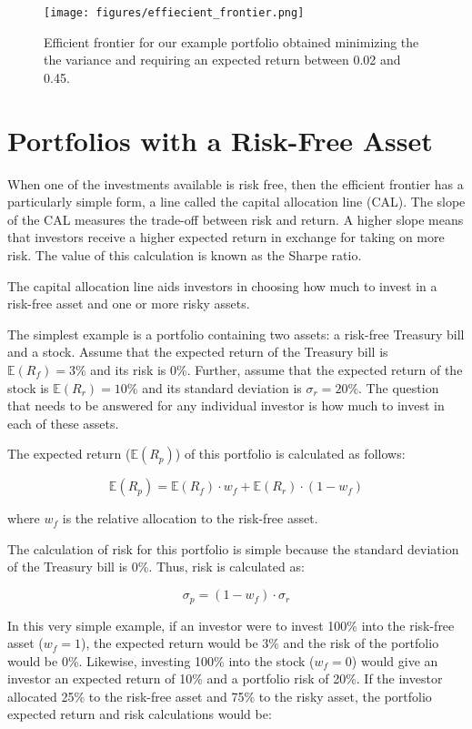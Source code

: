 \begin{figure}[htb]
\centering
\texttt{[image: figures/effiecient\_frontier.png]}
\caption{Efficient frontier for our example portfolio obtained minimizing the the variance and requiring an expected return between 0.02 and 0.45.}
\label{fig:efficient_frontier}
\end{figure}
    
\section{Portfolios with a Risk-Free
Asset}\label{portfolios-with-a-risk-free-asset}

When one of the investments available is risk free, then the efficient
frontier has a particularly simple form, a line called the capital
allocation line (CAL). The slope of the CAL measures the trade-off
between risk and return. A higher slope means that investors receive a
higher expected return in exchange for taking on more risk. The value of
this calculation is known as the Sharpe ratio.

The capital allocation line aids investors in choosing how much to
invest in a risk-free asset and one or more risky assets.

The simplest example is a portfolio containing two assets: a risk-free
Treasury bill and a stock. Assume that the expected return of the
Treasury bill is \(\mathbb{E}(R_f)=3\%\) and its risk is 0\%. Further, assume that
the expected return of the stock is \(\mathbb{E}(R_r)=10\%\) and its standard
deviation is \(\sigma_r=20\%\). The question that needs to be answered
for any individual investor is how much to invest in each of these
assets.

The expected return (\(\mathbb{E}(R_p)\)) of this portfolio is calculated as
follows:

\[ \mathbb{E}(R_p) = \mathbb{E}(R_f)\cdot w_f + \mathbb{E}(R_r)\cdot (1- w_f) \]

where \(w_f\) is the relative allocation to the risk-free asset.

The calculation of risk for this portfolio is simple because the
standard deviation of the Treasury bill is 0\%. Thus, risk is calculated
as:

\[ \sigma_p = (1-w_f)\cdot \sigma_r \]

In this very simple example, if an investor were to invest 100\% into
the risk-free asset (\(w_f=1\)), the expected return would be 3\% and
the risk of the portfolio would be 0\%. Likewise, investing 100\% into
the stock (\(w_f=0\)) would give an investor an expected return of 10\%
and a portfolio risk of 20\%. If the investor allocated 25\% to the
risk-free asset and 75\% to the risky asset, the portfolio expected
return and risk calculations would be:

